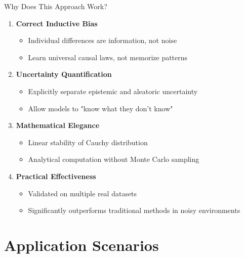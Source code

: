\documentclass[aspectratio=169,10pt]{beamer}
\begin{document}
\begin{frame}{Why Does This Approach Work?}
\begin{enumerate}
    \item \textbf{Correct Inductive Bias}
    \begin{itemize}
        \item Individual differences are information, not noise
        \item Learn universal causal laws, not memorize patterns
    \end{itemize}
    
    \item \textbf{Uncertainty Quantification}
    \begin{itemize}
        \item Explicitly separate epistemic and aleatoric uncertainty
        \item Allow models to "know what they don't know"
    \end{itemize}
    
    \item \textbf{Mathematical Elegance}
    \begin{itemize}
        \item Linear stability of Cauchy distribution
        \item Analytical computation without Monte Carlo sampling
    \end{itemize}
    
    \item \textbf{Practical Effectiveness}
    \begin{itemize}
        \item Validated on multiple real datasets
        \item Significantly outperforms traditional methods in noisy environments
    \end{itemize}
\end{enumerate}
\end{frame}

\section{Application Scenarios}
\end{document}
